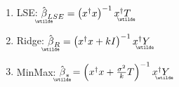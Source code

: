 \documentclass{article}
\begin{document}
\begin{enumerate}
\item LSE: $%
\underaccent{\wtilde}{\hat{\beta}}%
_{LSE}=\left( x^{\dagger }x\right) ^{-1}x^{\dagger }%
\underaccent{\wtilde}{T}%
$

\item Ridge: $%
\underaccent{\wtilde}{\hat{\beta}}%
_{R}=\left( x^{\dagger }x+kI\right) ^{-1}x^{\dagger }%
\underaccent{\wtilde}{Y}%
$

\item MinMax: $%
\underaccent{\wtilde}{\hat{\beta}}%
_{\ast }=\left( x^{\dagger }x+\frac{\sigma ^{2}}{k}T\right) ^{-1}x^{\dagger }%
\underaccent{\wtilde}{Y}%
$
\end{enumerate}
\end{document}
